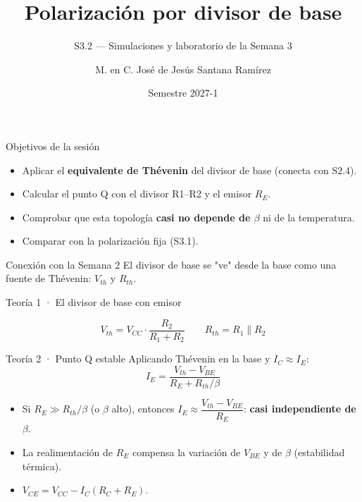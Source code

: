 \documentclass[aspectratio=169]{beamer}
\title[S3.2 · Divisor de base]{Polarización por divisor de base}
\subtitle{S3.2 — Simulaciones y laboratorio de la Semana 3}
\institute{Licenciatura en Ingeniería Aeroespacial\\ UNAM · ENES Unidad Juriquilla}
\author{M. en C. José de Jesús Santana Ramírez}
\date{Semestre 2027-1}
\begin{document}
\begin{frame}[plain]
  \titlepage
\end{frame}

\begin{frame}{Objetivos de la sesión}
  \begin{itemize}
    \item Aplicar el \textbf{equivalente de Thévenin} del divisor de base (conecta con S2.4).
    \item Calcular el punto Q con el divisor R1–R2 y el emisor $R_E$.
    \item Comprobar que esta topología \textbf{casi no depende de $\beta$} ni de la temperatura.
    \item Comparar con la polarización fija (S3.1).
  \end{itemize}
  \pause
  \begin{block}{Conexión con la Semana 2}
    El divisor de base se "ve" desde la base como una fuente de Thévenin: $V_{th}$ y $R_{th}$.
  \end{block}
\end{frame}

\begin{frame}{Teoría 1 · El divisor de base con emisor}
  \begin{center}
  \end{center}
  \[
    V_{th} = V_{CC}\cdot\frac{R_2}{R_1+R_2}
    \qquad
    R_{th} = R_1\parallel R_2
  \]
\end{frame}

\begin{frame}{Teoría 2 · Punto Q estable}
  Aplicando Thévenin en la base y $I_C \approx I_E$:
  \[
    I_E = \frac{V_{th}-V_{BE}}{R_E + R_{th}/\beta}
  \]
  \pause
  \begin{itemize}
    \item Si $R_E \gg R_{th}/\beta$ (o $\beta$ alto), entonces $I_E \approx \dfrac{V_{th}-V_{BE}}{R_E}$:
      \textbf{casi independiente de $\beta$}.
    \item La realimentación de $R_E$ compensa la variación de $V_{BE}$ y de $\beta$ (estabilidad térmica).
    \item $V_{CE} = V_{CC} - I_C(R_C + R_E)$.
  \end{itemize}
\end{frame}
\end{document}
